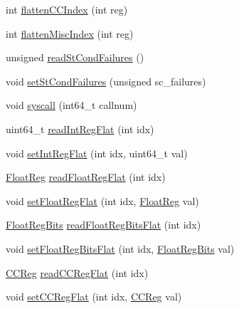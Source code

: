 \begin{DoxyCompactItemize}
\item 
int \hyperlink{classSimpleThread_ac33d74353e36a595ec48962cd0446320}{flattenCCIndex} (int reg)
\item 
int \hyperlink{classSimpleThread_a5adc7d32f3a8bd75c5dc0a62d95564fd}{flattenMiscIndex} (int reg)
\item 
unsigned \hyperlink{classSimpleThread_a25b995a791e41965e088d8bf3f2bf859}{readStCondFailures} ()
\item 
void \hyperlink{classSimpleThread_abbe779fa43c72cd485ddb736ab17ff61}{setStCondFailures} (unsigned sc\_\-failures)
\item 
void \hyperlink{classSimpleThread_a36e0b96120fcbbc2ee8699158f7be5c2}{syscall} (int64\_\-t callnum)
\item 
uint64\_\-t \hyperlink{classSimpleThread_aed7abd4afcb954f8612e4ef1fe73317a}{readIntRegFlat} (int idx)
\item 
void \hyperlink{classSimpleThread_ae3b8c9c2c1ae95767f0703357957a3f8}{setIntRegFlat} (int idx, uint64\_\-t val)
\item 
\hyperlink{classSimpleThread_a75484259f1855aabc8d74c6eb1cfe186}{FloatReg} \hyperlink{classSimpleThread_aaa32dc9f4a8719a465c267fed47cbdc6}{readFloatRegFlat} (int idx)
\item 
void \hyperlink{classSimpleThread_a71ec23ca2c029120932e5af4babc0da1}{setFloatRegFlat} (int idx, \hyperlink{classSimpleThread_a75484259f1855aabc8d74c6eb1cfe186}{FloatReg} val)
\item 
\hyperlink{classSimpleThread_aab5eeae86499f9bfe15ef79360eccc64}{FloatRegBits} \hyperlink{classSimpleThread_a2fa29585c9694c9bffcce2a63f871759}{readFloatRegBitsFlat} (int idx)
\item 
void \hyperlink{classSimpleThread_acd974292ff0461c2e94c0b5a1126b503}{setFloatRegBitsFlat} (int idx, \hyperlink{classSimpleThread_aab5eeae86499f9bfe15ef79360eccc64}{FloatRegBits} val)
\item 
\hyperlink{classSimpleThread_a0c9de550a32808e6a25b54b6c791d5ab}{CCReg} \hyperlink{classSimpleThread_a78f8bb511732f8abab3bd11a18d32072}{readCCRegFlat} (int idx)
\item 
void \hyperlink{classSimpleThread_a6dec2284dd5904f992642f24bb289f14}{setCCRegFlat} (int idx, \hyperlink{classSimpleThread_a0c9de550a32808e6a25b54b6c791d5ab}{CCReg} val)
\end{DoxyCompactItemize}

